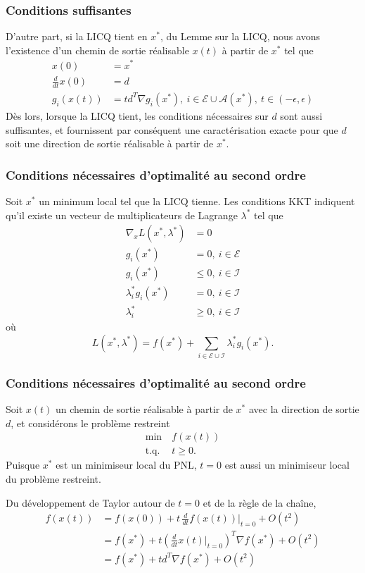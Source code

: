 \documentclass[usepdftitle=false,aspectratio=169]{beamer}
\def\cA{\mathcal{A}}
\def\cE{\mathcal{E}}
\def\cI{\mathcal{I}}
\begin{document}

\begin{frame}
\frametitle{Conditions suffisantes}

D'autre part, si la LICQ tient en $x^*$, du Lemme sur la LICQ, nous avons l'existence d'un chemin de sortie réalisable $x(t)$ à partir de $x^*$ tel que
\begin{align*}
x(0) &= x^* \\
\frac{d}{dt} x(0) &= d \\
g_i(x(t)) &= td^T\nabla g_i(x^*),\ i \in \cE \cup \cA(x^*),\ t \in (-\epsilon, \epsilon)
\end{align*}
Dès lors, lorsque la LICQ tient, les conditions nécessaires sur $d$ sont aussi suffisantes, et fournissent par conséquent une caractérisation exacte pour que $d$ soit une direction de sortie réalisable à partir de $x^*$.

\end{frame}

\begin{frame}
\frametitle{Conditions nécessaires d'optimalité au second ordre}

Soit $x^*$ un minimum local tel que la LICQ tienne.
Les conditions KKT indiquent qu'il existe un vecteur de multiplicateurs de Lagrange $\lambda^*$ tel que
\begin{align*}
\nabla_x L(x^*,\lambda^*) &= 0 \\
g_i(x^*) &= 0,\ i \in \cE \\
g_i(x^*) &\leq 0,\ i \in \cI \\
\lambda_i^* g_i(x^*) &= 0,\ i \in \cI \\
\lambda_i^* &\geq 0,\ i \in \cI
\end{align*}
où
$$
L(x^*, \lambda^*) = f(x^*) + \sum_{i \in \cE \cup \cI} \lambda_i^* g_i(x^*).
$$

\end{frame}

\begin{frame}
\frametitle{Conditions nécessaires d'optimalité au second ordre}

Soit $x(t)$ un chemin de sortie réalisable à partir de $x^*$ avec la direction de sortie $d$, et considérons le problème restreint
\begin{align*}
\min\ & f(x(t)) \\
\mbox{t.q. } & t \geq 0.
\end{align*}
Puisque $x^*$ est un minimiseur local du PNL, $t = 0$ est aussi un minimiseur local du problème restreint.

Du développement de Taylor autour de $t = 0$ et de la règle de la chaîne,
\begin{align*}
f(x(t)) &= f(x(0)) + t\, \frac{d}{dt} f(x(t)) \bigg|_{t=0} + O(t^2) \\
&= f(x^*) + t\left(\frac{d}{dt}x(t)\bigg|_{t=0}\right)^T \nabla f(x^*) + O(t^2) \\
&= f(x^*) + td^T \nabla f(x^*) + O(t^2)
\end{align*}

\end{frame}
\end{document}
